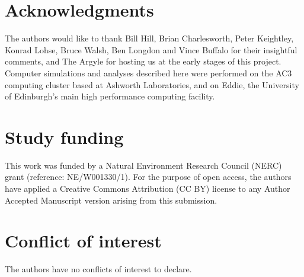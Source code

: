 \documentclass[12pt]{article}
\begin{document}
\begin{bibunit}
\section*{Acknowledgments}

The authors would like to thank Bill Hill, Brian Charlesworth, Peter Keightley, Konrad Lohse, Bruce Walsh, Ben Longdon and Vince Buffalo for their insightful comments, and The Argyle for hosting us at the early stages of this project. Computer simulations and analyses described here were performed on the AC3 computing cluster based at Ashworth Laboratories, and on Eddie, the University of Edinburgh's main high performance computing facility.

\section*{Study funding}
This work was funded by a Natural Environment Research Council (NERC) grant (reference: NE/W001330/1). For the purpose of open access, the authors have applied a Creative Commons Attribution (CC BY) license to any Author Accepted Manuscript version arising from this submission.

\section*{Conflict of interest}
The authors have no conflicts of interest to declare.

\putbib
\end{bibunit}
\newpage
\end{document}
